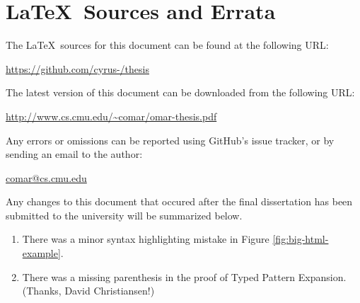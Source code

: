 \newpage
\section*{\LaTeX~Sources and Errata}
\noindent
The \LaTeX~sources for this document can be found at the following URL:
\begin{center}
\url{https://github.com/cyrus-/thesis}
\end{center}
The latest version of this document can be downloaded from the following URL:
\begin{center}
\url{http://www.cs.cmu.edu/~comar/omar-thesis.pdf}
\end{center}
Any errors or omissions can be reported using GitHub's issue tracker, or by sending an email to the author:
\begin{center}
\url{comar@cs.cmu.edu}
\end{center}
Any changes to this document that occured after the final dissertation has been submitted to the university will be summarized below.

\begin{enumerate}
	\item There was a minor syntax highlighting mistake in Figure \ref{fig:big-html-example}.
	\item There was a missing parenthesis in the proof of Typed Pattern Expansion. (Thanks, David Christiansen!)
\end{enumerate}